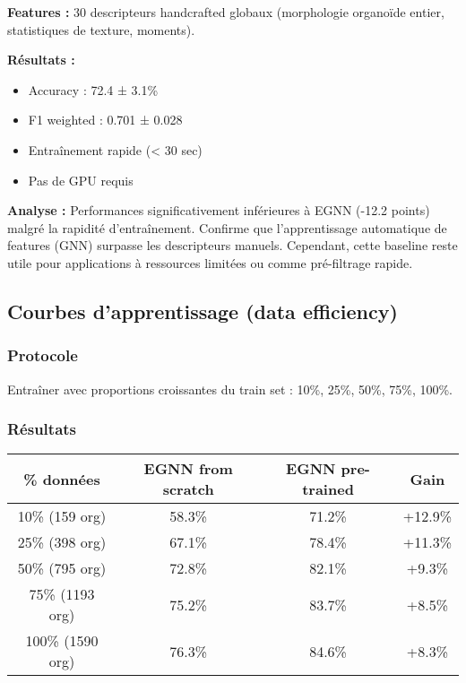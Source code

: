 \textbf{Features :}
30 descripteurs handcrafted globaux (morphologie organoïde entier, statistiques de texture, moments).

\textbf{Résultats :}
\begin{itemize}
    \item Accuracy : 72.4 ± 3.1\%
    \item F1 weighted : 0.701 ± 0.028
    \item Entraînement rapide (< 30 sec)
    \item Pas de GPU requis
\end{itemize}

\textbf{Analyse :}
Performances significativement inférieures à EGNN (-12.2 points) malgré la rapidité d'entraînement. Confirme que l'apprentissage automatique de features (GNN) surpasse les descripteurs manuels. Cependant, cette baseline reste utile pour applications à ressources limitées ou comme pré-filtrage rapide.

\subsection{Courbes d'apprentissage (data efficiency)}

\subsubsection{Protocole}

Entraîner avec proportions croissantes du train set : 10\%, 25\%, 50\%, 75\%, 100\%.

\subsubsection{Résultats}

\begin{center}
\begin{tabular}{|c|c|c|c|}
\hline
\textbf{\% données} & \textbf{EGNN from scratch} & \textbf{EGNN pre-trained} & \textbf{Gain} \\
\hline
10\% (159 org) & 58.3\% & 71.2\% & +12.9\% \\
25\% (398 org) & 67.1\% & 78.4\% & +11.3\% \\
50\% (795 org) & 72.8\% & 82.1\% & +9.3\% \\
75\% (1193 org) & 75.2\% & 83.7\% & +8.5\% \\
100\% (1590 org) & 76.3\% & 84.6\% & +8.3\% \\
\hline
\end{tabular}
\end{center}

